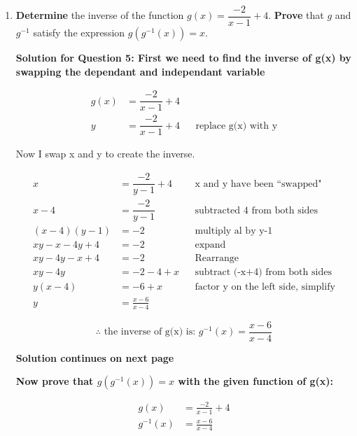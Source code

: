 \documentclass[12pt]{book}
\begin{document}
\begin{enumerate}
\newpage

\item \textbf{Determine} the inverse of the function $g(x)=\dfrac{-2}{x-1}+4$. \textbf{Prove} that $g$ and $g^{-1}$ satisfy the expression $g(g^{-1}(x))=x$.

\vspace{1em}
\textbf{Solution for Question 5: First we need to find the inverse of g(x) by swapping the dependant and independant variable}

\begin{align*}
    g(x) &=\dfrac{-2}{x-1}+4 \\
    y &=\dfrac{-2}{x-1}+4 && \text{replace g(x) with y}
\end{align*}

\begin{center}
    Now I swap x and y to create the inverse.
\end{center}

\begin{align*}
    x &=\dfrac{-2}{y-1}+4 && \text{x and y have been ``swapped"} \\
    x-4 &=\dfrac{-2}{y-1} && \text{subtracted 4 from both sides} \\
    (x-4)(y-1) &= -2 && \text{multiply al by y-1} \\
    xy-x-4y+4 &= -2 && \text{expand} \\
    xy-4y-x+4 &= -2 && \text{Rearrange}\\
    xy-4y &= -2-4+x && \text{subtract (-x+4) from both sides} \\
    y(x-4) &= -6+x && \text{factor y on the left side, simplify} \\
    y &= \frac{x-6}{x-4}
\end{align*}

$$\therefore \text{ the inverse of g(x) is: } \boxed{g^{-1}(x) = \frac{x-6}{x-4}} $$

\vspace{3em}
\begin{center}
    \textbf{Solution continues on next page}
\end{center}

\newpage
\begin{center}
    \textbf{Now prove that $g(g^{-1}(x)) = x$ with the given function of g(x):}
\end{center}

\begin{align*}
    g(x) &= \frac{-2}{x-1}+4\\
    g^{-1}(x) &= \frac{x-6}{x-4} \\
\end{align*}
\vspace{-5em}


\end{enumerate}
\end{document}
